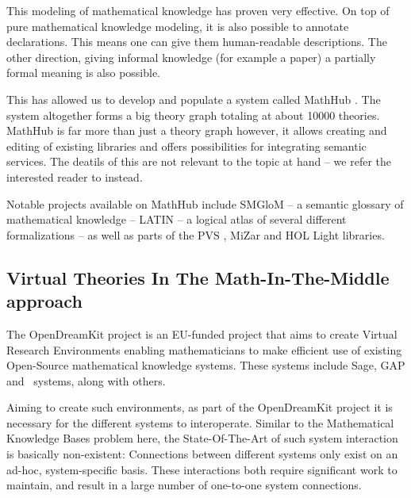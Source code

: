 This modeling of mathematical knowledge has proven very effective. 
On top of pure mathematical knowledge modeling, it is also possible to annotate declarations. 
This means one can give them human-readable descriptions.
The other direction, giving informal knowledge (for example a paper) a partially formal meaning is also possible.

This has allowed us to develop and populate a system called MathHub \cite{MathHub:on}. 
The system altogether forms a big theory graph totaling at about 10000 theories. 
MathHub is far more than just a theory graph however, it allows creating and editing of existing libraries and offers possibilities for integrating semantic services.
The deatils of this are not relevant to the topic at hand -- we refer the interested reader to \cite{Iancu:phd} instead.

Notable projects available on MathHub include SMGloM \cite{SMGloM:on} -- a semantic glossary of mathematical knowledge -- LATIN \cite{LATIN:online} -- a logical atlas of several different formalizations  -- as well as parts of the PVS \cite{PVSlibraries:on}, MiZar \cite{mizar:online} and HOL Light \cite{KalRab:hollight:14} libraries.

\subsection{Virtual Theories In The Math-In-The-Middle approach}\label{sec:mmtmitm:odk}

The OpenDreamKit \cite{OpenDreamKit:on} project is an EU-funded project that aims to create Virtual Research Environments enabling mathematicians to make efficient use of existing Open-Source mathematical knowledge systems. 
These systems include Sage, GAP and \lmfdb\ systems, along with others. 

Aiming to create such environments, as part of the OpenDreamKit project it is necessary for the different systems to interoperate. 
Similar to the Mathematical Knowledge Bases problem here, the State-Of-The-Art of such system interaction is basically non-existent: 
Connections between different systems only exist on an ad-hoc, system-specific basis. 
These interactions both require significant work to maintain, and result in a large number of one-to-one system connections. 

